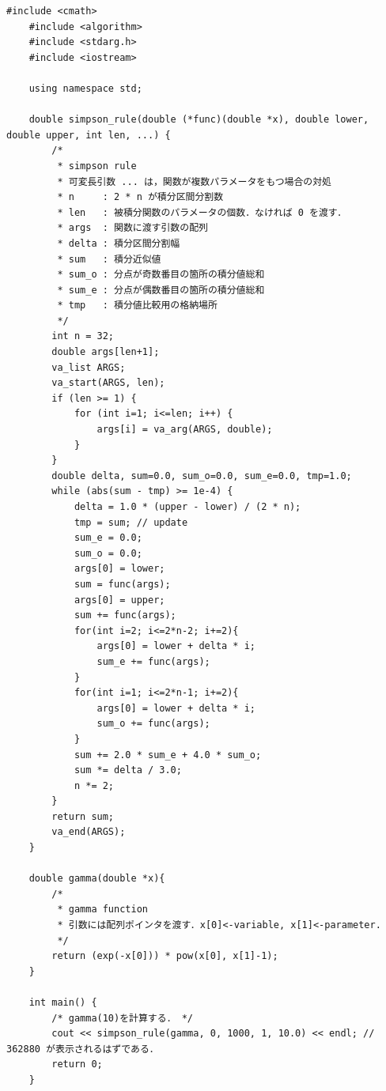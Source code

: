 \documentclass[a4j,papersize,disablejfam,slide,14pt]{jsarticle}
\begin{document}
    \begin{lstlisting}[style=customCpp]
    #include <cmath>
    #include <algorithm>
	#include <stdarg.h>
    #include <iostream>
    
    using namespace std;
    
    double simpson_rule(double (*func)(double *x), double lower, double upper, int len, ...) {
		/*
		 * simpson rule
		 * 可変長引数 ... は，関数が複数パラメータをもつ場合の対処
		 * n     : 2 * n が積分区間分割数
		 * len   : 被積分関数のパラメータの個数．なければ 0 を渡す．
		 * args  : 関数に渡す引数の配列
		 * delta : 積分区間分割幅
		 * sum   : 積分近似値
		 * sum_o : 分点が奇数番目の箇所の積分値総和
		 * sum_e : 分点が偶数番目の箇所の積分値総和
		 * tmp   : 積分値比較用の格納場所
		 */
		int n = 32;
		double args[len+1];
		va_list ARGS;
		va_start(ARGS, len);
		if (len >= 1) {
			for (int i=1; i<=len; i++) {
				args[i] = va_arg(ARGS, double);
			}
		}
		double delta, sum=0.0, sum_o=0.0, sum_e=0.0, tmp=1.0;
		while (abs(sum - tmp) >= 1e-4) {
			delta = 1.0 * (upper - lower) / (2 * n);
			tmp = sum; // update
			sum_e = 0.0;
			sum_o = 0.0;
			args[0] = lower;
			sum = func(args);
			args[0] = upper;
			sum += func(args);
			for(int i=2; i<=2*n-2; i+=2){
				args[0] = lower + delta * i;
				sum_e += func(args);
			}
			for(int i=1; i<=2*n-1; i+=2){
				args[0] = lower + delta * i;
				sum_o += func(args);
			}
			sum += 2.0 * sum_e + 4.0 * sum_o;
			sum *= delta / 3.0;
			n *= 2;
		}
		return sum;
	    va_end(ARGS);
	}
    
    double gamma(double *x){
		/* 
         * gamma function 
         * 引数には配列ポインタを渡す．x[0]<-variable, x[1]<-parameter.
         */
	    return (exp(-x[0])) * pow(x[0], x[1]-1);
	}
    
    int main() {
    	/* gamma(10)を計算する． */
    	cout << simpson_rule(gamma, 0, 1000, 1, 10.0) << endl; // 362880 が表示されるはずである．
        return 0;
    }
    \end{lstlisting}
\end{document}
